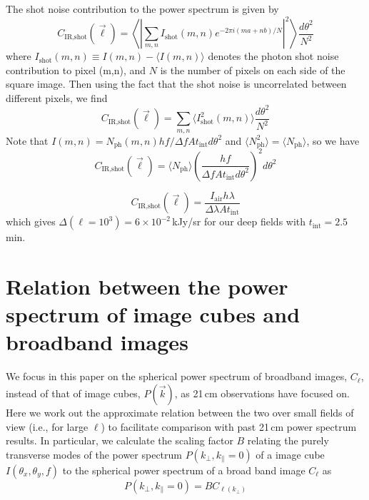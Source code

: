 \documentclass[numberedappendix]{emulateapj}
\newcommand{\IR}{\text{IR}}
\newcommand{\shot}{\text{shot}}
\begin{document}
The shot noise contribution to the power spectrum is given by
\begin{equation}
C_{\IR, \shot}(\vec{\ell}) = \left\langle\left|\sum_{m,n}I_\shot(m,n)e^{-2\pi i(ma+nb)/N}\right|^2\right\rangle \frac{d\theta^2}{N^2}
\end{equation}
where $I_\shot(m,n)\equiv I(m,n)-\langle I(m,n)\rangle$ denotes the photon shot noise contribution to pixel (m,n), and $N$ is the number of pixels on each side of the square image. Then using the fact that the shot noise is uncorrelated between different pixels, we find
\begin{equation}
C_{\IR, \shot}(\vec{\ell}) = \sum_{m,n}\langle I^2_\shot(m,n)\rangle \frac{d\theta^2}{N^2}
\end{equation}
Note that $I(m,n)=N_\text{ph}(m,n)hf/\Delta f A t_\text{int}d\theta^2$ and $\langle N_\text{ph}^2\rangle = \langle N_\text{ph}\rangle$, so we have
\begin{equation}
C_{\IR, \shot}(\vec{\ell}) = \langle N_\text{ph}\rangle \left(\frac{hf}{\Delta f A t_\text{int}d\theta^2}\right)^2 d\theta^2
\end{equation}

\begin{equation}
C_{\IR, \shot}(\vec{\ell}) =\frac{I_\text{air}h\lambda}{\Delta \lambda A t_\text{int}}
\end{equation}
which gives $\Delta(\ell=10^3)=6\times10^{-2}$\,kJy/sr for our deep fields with $t_\text{int}=2.5$\,min. %

\section{Relation between the power spectrum of image cubes and broadband images}
\label{sec:pspecrelation}

We focus in this paper on the spherical power spectrum of broadband images, $C_\ell$,  instead of that of image cubes, $P(\vec{k})$, as 21\,cm observations have focused on. Here we work out the approximate relation between the two over small fields of view (i.e., for large $\ell$) to facilitate comparison with past 21\,cm power spectrum results. In particular, we calculate the scaling factor $B$ relating the purely transverse modes of the power spectrum $P(k_\perp,k_\parallel=0)$ of a image cube $I(\theta_x,\theta_y,f)$ to the spherical power spectrum of a broad band image $C_\ell$ as
\begin{equation}
P(k_\perp,k_\parallel=0) = B C_{\ell(k_\perp)}
\end{equation}
\end{document}
